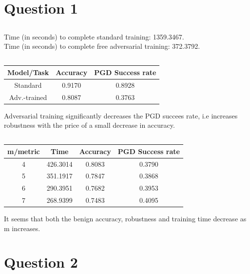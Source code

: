 \documentclass{article}
\begin{document}
\section{Question 1}
\setcounter{subsection}{2}
\subsection{}
Time (in seconds) to complete standard training: 1359.3467. \\
Time (in seconds) to complete free adversarial training: 372.3792.
\subsection{}
\begin{center}
\begin{tabular}{||c c c||} 
    \hline
    Model/Task & Accuracy & PGD Success rate \\ [0.5ex] 
    \hline\hline
    Standard & 0.9170 & 0.8928 \\ 
    \hline
    Adv.-trained & 0.8087 & 0.3763 \\
    \hline 
\end{tabular}
\end{center}
Adversarial training significantly decreases the PGD succees rate, i.e increases robustness with the price of a small decrease in accuracy.
\subsection{}
\begin{center}
\begin{tabular}{||c c c c||} 
    \hline
    m/metric & Time & Accuracy & PGD Success rate \\ [0.5ex] 
    \hline\hline
    4 & 426.3014 & 0.8083 & 0.3790 \\ 
    \hline
    5 & 351.1917 & 0.7847 & 0.3868 \\
    \hline
    6 & 290.3951 & 0.7682 & 0.3953 \\
    \hline
    7 & 268.9399 & 0.7483 & 0.4095 \\
    \hline 
\end{tabular}
\end{center}
It seems that both the benign accuracy, robustness and training time decrease as m increases.
\section{Question 2}
\setcounter{subsection}{1}
\end{document}
